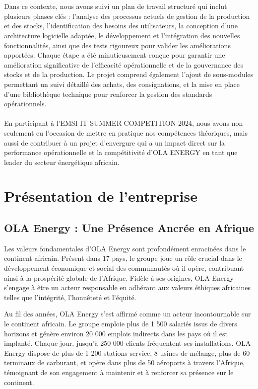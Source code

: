 \documentclass[a4paper, oneside, 12pt, final]{extreport}
\begin{document}
\\
\\
Dans ce contexte, nous avons suivi un plan de travail structuré qui inclut plusieurs phases clés : l'analyse des processus actuels de gestion de la production et des stocks, l'identification des besoins des utilisateurs, la conception d'une architecture logicielle adaptée, le développement et l'intégration des nouvelles fonctionnalités, ainsi que des tests rigoureux pour valider les améliorations apportées. Chaque étape a été minutieusement conçue pour garantir une amélioration significative de l'efficacité opérationnelle et de la gouvernance des stocks et de la production. Le projet comprend également l'ajout de sous-modules permettant un suivi détaillé des achats, des consignations, et la mise en place d'une bibliothèque technique pour renforcer la gestion des standards opérationnels.
\\
\\
En participant à l'\textsc{EMSI IT SUMMER COMPETITION 2024}, nous avons non seulement eu l'occasion de mettre en pratique nos compétences théoriques, mais aussi de contribuer à un projet d'envergure qui a un impact direct sur la performance opérationnelle et la compétitivité d'\textsc{OLA ENERGY} en tant que leader du secteur énergétique africain.
\chapter{Présentation de l'entreprise}
\section{OLA Energy : Une Présence Ancrée en Afrique}

Les valeurs fondamentales d'OLA Energy sont profondément enracinées dans le continent africain. Présent dans 17 pays, le groupe joue un rôle crucial dans le développement économique et social des communautés où il opère, contribuant ainsi à la prospérité globale de l'Afrique. Fidèle à ses origines, OLA Energy s'engage à être un acteur responsable en adhérant aux valeurs éthiques africaines telles que l'intégrité, l'honnêteté et l'équité.

Au fil des années, OLA Energy s'est affirmé comme un acteur incontournable sur le continent africain. Le groupe emploie plus de 1 500 salariés issus de divers horizons et génère environ 20 000 emplois indirects dans les pays où il est implanté. Chaque jour, jusqu'à 250 000 clients fréquentent ses installations. OLA Energy dispose de plus de 1 200 stations-service, 8 usines de mélange, plus de 60 terminaux de carburant, et opère dans plus de 50 aéroports à travers l'Afrique, témoignant de son engagement à maintenir et à renforcer sa présence sur le continent.
\end{document}
